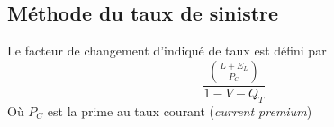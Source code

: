 \documentclass[10pt, french]{article}
\begin{document}
\begin{multicols*}{3}
\subsection{Méthode du taux de sinistre}
Le facteur de changement d'indiqué de taux est défini par
\begin{equation}
\frac{\left( \frac{L + E_L}{P_C} \right)}{1 - V - Q_T}
\end{equation}
Où $P_C$ est la prime au taux courant (\textit{current premium})



\end{multicols*}
\end{document}
